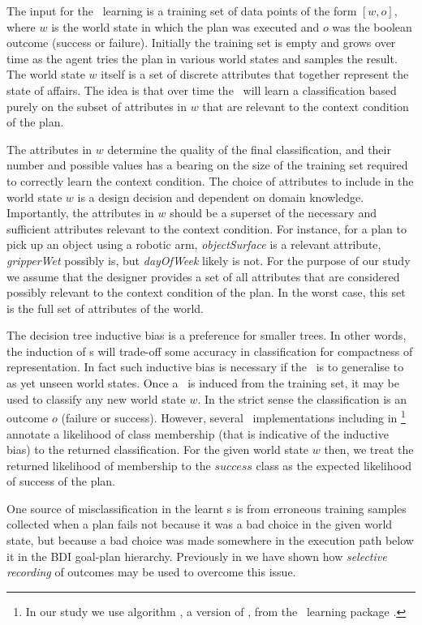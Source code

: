 The input for the \dt\ learning is a training set of data points of the form $[w,o]$, where $w$ is the world state in which the plan was executed and $o$ was the boolean outcome (success or failure). Initially the training set is empty and grows over time as the agent tries the plan in various world states and samples the result. The world state $w$ itself is a set of discrete attributes that together represent the state of affairs. The idea is that over time the \dt\ will learn a classification based purely on the subset of attributes in $w$ that are relevant to the context condition of the plan. 

The attributes in $w$ determine the quality of the final classification, and their number and possible values has a bearing on the size of the training set required to correctly learn the context condition. The choice of attributes to include in the world state $w$ is a design decision and dependent on domain knowledge. Importantly, the attributes in $w$ should be a superset of the necessary and sufficient attributes relevant to the context condition. For instance, for a plan to pick up an object using a robotic arm, \textit{objectSurface} is a relevant attribute, \textit{gripperWet} possibly is, but \textit{dayOfWeek} likely is not. For the purpose of our study we assume that the designer provides a set of all attributes that are considered possibly relevant to the context condition of the plan. In the worst case, this set is the full set of attributes of the world. 

The decision tree inductive bias is a preference for smaller trees. In other words, the induction of \dt s will trade-off some accuracy in classification for compactness of representation. In fact such inductive bias is necessary if the \dt\ is to generalise to as yet unseen world states. Once a \dt\ is induced from the training set, it may be used to classify any new world state $w$. In the strict sense the classification is an outcome $o$ (failure or success). However, several \dt\ implementations including  in \weka\footnote{In our study we use algorithm , a version of  \cite{Mitchell97:ML}, from the \weka\ learning package \cite{weka99}.} annotate a likelihood of class membership (that is indicative of the inductive bias) to the returned classification. For the given world state $w$ then, we treat the returned likelihood of membership to the $success$ class as the expected likelihood of success of the plan.

One source of misclassification in the learnt \dt s is from erroneous training samples collected when a plan fails not because it was a bad choice in the given world state, but because a bad choice was made somewhere in the execution path below it in the BDI goal-plan hierarchy. Previously in \cite{Airiau:IJAT:09} we have shown how \textit{selective recording} of outcomes may be used to overcome this issue.

